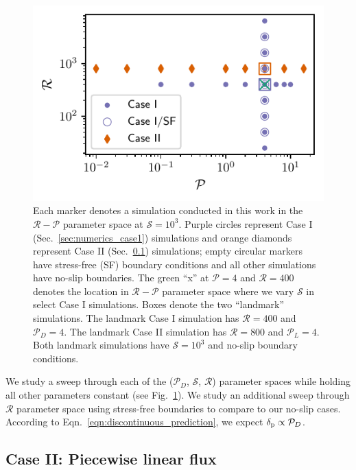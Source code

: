 \documentclass[twocolumn, linenumbers]{aastex631}
\newcommand{\delp}{\ensuremath{\delta_{\rm{p}}}}
\newcommand{\mP}{\ensuremath{\mathcal{P}}}
\newcommand{\mR}{\ensuremath{\mathcal{R}}}
\newcommand{\mS}{\ensuremath{\mathcal{S}}}
\begin{document}
\begin{figure}[t]
\centering
\includegraphics[width=\columnwidth]{parameter_space.pdf}
\caption{
Each marker denotes a simulation conducted in this work in the $\mR-\mP$ parameter space at $\mS = 10^3$. 
Purple circles represent Case I (Sec.~\ref{sec:numerics_case1}) simulations and orange diamonds represent Case II (Sec.~\ref{sec:numerics_case2}) simulations; empty circular markers have stress-free (SF) boundary conditions and all other simulations have no-slip boundaries.
The green ``x'' at $\mP = 4$ and $\mR = 400$ denotes the location in $\mR-\mP$ parameter space where we vary $\mS$ in select Case I simulations.
Boxes denote the two ``landmark'' simulations.
The landmark Case I simulation has $\mR = 400$ and $\mP_D = 4$.
The landmark Case II simulation has $\mR = 800$ and $\mP_L = 4$.
Both landmark simulations have $\mS = 10^3$ and no-slip boundary conditions.
\label{fig:parameter_space}
}
\end{figure}





We study a sweep through each of the ($\mP_D$, $\mS$, $\mR$) parameter spaces while holding all other parameters constant (see Fig.~\ref{fig:parameter_space}).
We study an additional sweep through $\mR$ parameter space using stress-free boundaries to compare to our no-slip cases.
According to Eqn.~\ref{eqn:discontinuous_prediction}, we expect $\delp \propto \mP_D$.


\subsection{Case II: Piecewise linear flux}
\label{sec:numerics_case2}
\end{document}
